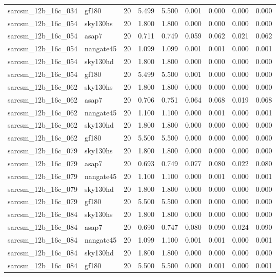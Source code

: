 \begin{tabular}{llrrrrrrr}
sarcsm\_12b\_16c\_034 & gf180 & 20 & 5.499 & 5.500 & 0.001 & 0.000 & 0.000 & 0.000 \\
sarcsm\_12b\_16c\_054 & sky130hs & 20 & 1.800 & 1.800 & 0.000 & 0.000 & 0.000 & 0.000 \\
sarcsm\_12b\_16c\_054 & asap7 & 20 & 0.711 & 0.749 & 0.059 & 0.062 & 0.021 & 0.062 \\
sarcsm\_12b\_16c\_054 & nangate45 & 20 & 1.099 & 1.099 & 0.001 & 0.001 & 0.000 & 0.001 \\
sarcsm\_12b\_16c\_054 & sky130hd & 20 & 1.800 & 1.800 & 0.000 & 0.000 & 0.000 & 0.000 \\
sarcsm\_12b\_16c\_054 & gf180 & 20 & 5.499 & 5.500 & 0.001 & 0.000 & 0.000 & 0.000 \\
sarcsm\_12b\_16c\_062 & sky130hs & 20 & 1.800 & 1.800 & 0.000 & 0.000 & 0.000 & 0.000 \\
sarcsm\_12b\_16c\_062 & asap7 & 20 & 0.706 & 0.751 & 0.064 & 0.068 & 0.019 & 0.068 \\
sarcsm\_12b\_16c\_062 & nangate45 & 20 & 1.100 & 1.100 & 0.000 & 0.001 & 0.000 & 0.001 \\
sarcsm\_12b\_16c\_062 & sky130hd & 20 & 1.800 & 1.800 & 0.000 & 0.000 & 0.000 & 0.000 \\
sarcsm\_12b\_16c\_062 & gf180 & 20 & 5.500 & 5.500 & 0.000 & 0.000 & 0.000 & 0.000 \\
sarcsm\_12b\_16c\_079 & sky130hs & 20 & 1.800 & 1.800 & 0.000 & 0.000 & 0.000 & 0.000 \\
sarcsm\_12b\_16c\_079 & asap7 & 20 & 0.693 & 0.749 & 0.077 & 0.080 & 0.022 & 0.080 \\
sarcsm\_12b\_16c\_079 & nangate45 & 20 & 1.100 & 1.100 & 0.000 & 0.001 & 0.000 & 0.001 \\
sarcsm\_12b\_16c\_079 & sky130hd & 20 & 1.800 & 1.800 & 0.000 & 0.000 & 0.000 & 0.000 \\
sarcsm\_12b\_16c\_079 & gf180 & 20 & 5.500 & 5.500 & 0.000 & 0.000 & 0.000 & 0.000 \\
sarcsm\_12b\_16c\_084 & sky130hs & 20 & 1.800 & 1.800 & 0.000 & 0.000 & 0.000 & 0.000 \\
sarcsm\_12b\_16c\_084 & asap7 & 20 & 0.690 & 0.747 & 0.080 & 0.090 & 0.024 & 0.090 \\
sarcsm\_12b\_16c\_084 & nangate45 & 20 & 1.099 & 1.100 & 0.001 & 0.001 & 0.000 & 0.001 \\
sarcsm\_12b\_16c\_084 & sky130hd & 20 & 1.800 & 1.800 & 0.000 & 0.000 & 0.000 & 0.000 \\
sarcsm\_12b\_16c\_084 & gf180 & 20 & 5.500 & 5.500 & 0.000 & 0.001 & 0.000 & 0.001 \\

\end{tabular}
